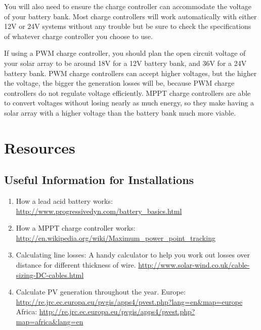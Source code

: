 \documentclass{article}
\theoremstyle{definition}
\theoremstyle{definition}
\theoremstyle{remark}
\begin{document}
  You will also need to ensure the charge controller can accommodate the voltage of your battery bank. Most charge controllers will work automatically with either 12V or 24V systems without any trouble but be sure to check the specifications of whatever charge controller you choose to use.

  If using a PWM charge controller, you should plan the open circuit voltage of your solar array to be around 18V for a 12V battery bank, and 36V for a 24V battery bank. PWM charge controllers can accept higher voltages, but the higher the voltage, the bigger the generation losses will be, because PWM charge controllers do not regulate voltage efficiently. MPPT charge controllers are able to convert voltages without losing nearly as much energy, so they make having a solar array with a higher voltage than the battery bank much more viable.


\section{Resources} %
\label{sec:resources}

  \subsection{Useful Information for Installations} %
  \label{sub:useful_information_for_installations}

    \begin{enumerate}
      \item How a lead acid battery works: \href{http://www.progressivedyn.com/battery\_basics.html}{http://www.progressivedyn.com/battery\_basics.html}
      \item How a MPPT charge controller works: \newline
      \href{http://en.wikipedia.org/wiki/Maximum\_power\_point\_tracking}{http://en.wikipedia.org/wiki/Maximum\_power\_point\_tracking}
      \item Calculating line losses: A handy calculator to help you work out losses over distance for different \newline
      thickness of wire. \href{http://www.solar-wind.co.uk/cable-sizing-DC-cables.html}{http://www.solar-wind.co.uk/cable-sizing-DC-cables.html}
      \item Calculate PV generation throughout the year. \newline
      Europe: \href{http://re.jrc.ec.europa.eu/pvgis/apps4/pvest.php?lang=en\&map=europe}{http://re.jrc.ec.europa.eu/pvgis/apps4/pvest.php?lang=en\&map=europe} \newline
      Africa: \href{http://re.jrc.ec.europa.eu/pvgis/apps4/pvest.php?map=africa\&lang=en}{http://re.jrc.ec.europa.eu/pvgis/apps4/pvest.php?map=africa\&lang=en}
    \end{enumerate}
  
\end{document}
